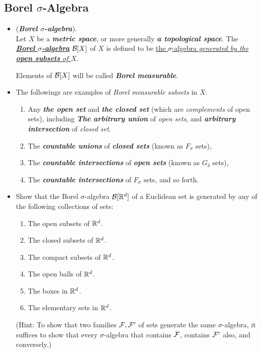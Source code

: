 \documentclass[11pt]{article}
\begin{document}
\subsection{Borel $\sigma$-Algebra}
\begin{itemize}
\item \begin{definition} (\emph{\textbf{Borel $\sigma$-algebra}}). \citep{tao2011introduction} \\
 Let $X$ be a \emph{\textbf{metric space}}, or more generally \emph{\textbf{a topological space}}. The \underline{\emph{\textbf{Borel $\sigma$-algebra}}} ${\mathcal B}[X]$ of $X$ is defined to be \underline{the $\sigma$-algebra \emph{generated by the \textbf{open subsets} of $X$}}.

Elements of ${\mathcal B}[X]$ will be called \emph{\textbf{Borel measurable}}.
\end{definition}

\item \begin{example}
The followings are examples of \emph{Borel measurable subsets} in $X$: 
\begin{enumerate}
\item Any \emph{\textbf{the open set}} and \emph{\textbf{the closed set}} (which are \emph{complements} of open sets),
including \emph{\textbf{The arbitrary union}} of \emph{open sets}, and \emph{\textbf{arbitrary intersection}} of \emph{closed set}. 
\item The \emph{\textbf{countable unions}} of \emph{\textbf{closed sets}} (known as $F_{\sigma}$ sets), 
\item The \emph{\textbf{countable intersections}} of \emph{\textbf{open sets}} (known as $G_{\delta}$ sets), 
\item The \emph{\textbf{countable intersections}} of $F_{\sigma}$ sets, and so forth.
\end{enumerate}
\end{example}

\item \begin{exercise}
Show that the Borel $\sigma$-algebra ${\mathcal B}[{\mathbb R}^d]$ of a Euclidean set is generated by any of the following collections of sets:
\begin{enumerate}
\item The open subsets of ${\mathbb R}^d$.
\item The closed subsets of ${\mathbb R}^d$.
\item The compact subsets of ${\mathbb R}^d$.
\item The open balls of ${\mathbb R}^d$.
\item The boxes in ${\mathbb R}^d$.
\item The elementary sets in ${\mathbb R}^d$.
\end{enumerate} 
(Hint: To show that two families ${\mathcal F}, {\mathcal F}'$ of sets generate the same $\sigma$-algebra, it suffices to show that every $\sigma$-algebra that contains ${\mathcal F}$, contains ${\mathcal F}'$ also, and conversely.)
\end{exercise}


\end{itemize}
\end{document}
